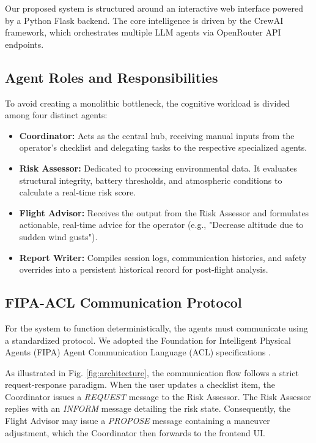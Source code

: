 \documentclass[conference]{IEEEtran}
\begin{document}
Our proposed system is structured around an interactive web interface powered by a Python Flask backend. The core intelligence is driven by the CrewAI framework, which orchestrates multiple LLM agents via OpenRouter API endpoints.

\subsection{Agent Roles and Responsibilities}
To avoid creating a monolithic bottleneck, the cognitive workload is divided among four distinct agents:
\begin{itemize}
    \item \textbf{Coordinator:} Acts as the central hub, receiving manual inputs from the operator's checklist and delegating tasks to the respective specialized agents.
    \item \textbf{Risk Assessor:} Dedicated to processing environmental data. It evaluates structural integrity, battery thresholds, and atmospheric conditions to calculate a real-time risk score.
    \item \textbf{Flight Advisor:} Receives the output from the Risk Assessor and formulates actionable, real-time advice for the operator (e.g., "Decrease altitude due to sudden wind gusts").
    \item \textbf{Report Writer:} Compiles session logs, communication histories, and safety overrides into a persistent historical record for post-flight analysis.
\end{itemize}

\subsection{FIPA-ACL Communication Protocol}
For the system to function deterministically, the agents must communicate using a standardized protocol. We adopted the Foundation for Intelligent Physical Agents (FIPA) Agent Communication Language (ACL) specifications \cite{b4}. 

As illustrated in Fig. \ref{fig:architecture}, the communication flow follows a strict request-response paradigm. When the user updates a checklist item, the Coordinator issues a \textit{REQUEST} message to the Risk Assessor. The Risk Assessor replies with an \textit{INFORM} message detailing the risk state. Consequently, the Flight Advisor may issue a \textit{PROPOSE} message containing a maneuver adjustment, which the Coordinator then forwards to the frontend UI.
\end{document}
